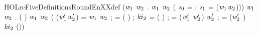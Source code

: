 \begin{SaveVerbatim}{HOLrcFiveDefinitionsRoundEnXXdef}
\HOLTokenTurnstile{} (\HOLSymConst{\HOLTokenForall{}}\ensuremath{\HOLBoundVar{w}\sb{\mathrm{1}}} \ensuremath{\HOLBoundVar{w}\sb{\mathrm{2}}} .
        \ensuremath{\HOLBoundVar{w}\sb{\mathrm{1}}} \ensuremath{\HOLBoundVar{w}\sb{\mathrm{2}}}  \HOLSymConst{=}
      ( \ensuremath{\HOLBoundVar{s}\sb{\mathrm{0}}} =   ; \ensuremath{\HOLBoundVar{s}\sb{\mathrm{1}}} =     (\ensuremath{\HOLBoundVar{w}\sb{\mathrm{1}}}\HOLSymConst{,}\ensuremath{\HOLBoundVar{w}\sb{\mathrm{2}}}))) \HOLSymConst{\HOLTokenConj{}}
   \HOLSymConst{\HOLTokenForall{}} \ensuremath{\HOLBoundVar{w}\sb{\mathrm{1}}} \ensuremath{\HOLBoundVar{w}\sb{\mathrm{2}}} .
      ( ) \ensuremath{\HOLBoundVar{w}\sb{\mathrm{1}}} \ensuremath{\HOLBoundVar{w}\sb{\mathrm{2}}}  \HOLSymConst{=}
     (
        (\ensuremath{\HOLBoundVar{w}\sb{\mathrm{1}}\sp{\prime{}}}\HOLSymConst{,}\ensuremath{\HOLBoundVar{w}\sb{\mathrm{2}}\sp{\prime{}}}) =   \ensuremath{\HOLBoundVar{w}\sb{\mathrm{1}}} \ensuremath{\HOLBoundVar{w}\sb{\mathrm{2}}} ;
         =  ( \HOLSymConst{\HOLTokenProd{}}  ) ;
        \ensuremath{\HOLBoundVar{ki}\sb{\mathrm{2}}} =  ( \HOLSymConst{\HOLTokenProd{}}   \HOLSymConst{\ensuremath{+}} ) ;
         = (\ensuremath{\HOLBoundVar{w}\sb{\mathrm{1}}\sp{\prime{}}} \HOLSymConst{\HOLTokenEor{}} \ensuremath{\HOLBoundVar{w}\sb{\mathrm{2}}\sp{\prime{}}}) \HOLSymConst{\HOLTokenRol{}}  \ensuremath{\HOLBoundVar{w}\sb{\mathrm{2}}\sp{\prime{}}} \HOLSymConst{\ensuremath{+}} ;
         = (\ensuremath{\HOLBoundVar{w}\sb{\mathrm{2}}\sp{\prime{}}} \HOLSymConst{\HOLTokenEor{}} ) \HOLSymConst{\HOLTokenRol{}}   \HOLSymConst{\ensuremath{+}} \ensuremath{\HOLBoundVar{ki}\sb{\mathrm{2}}}
        (\HOLSymConst{,}))
\end{SaveVerbatim}
\newcommand{\HOLrcFiveDefinitionsRoundEnXXdef}{\UseVerbatim{HOLrcFiveDefinitionsRoundEnXXdef}}
